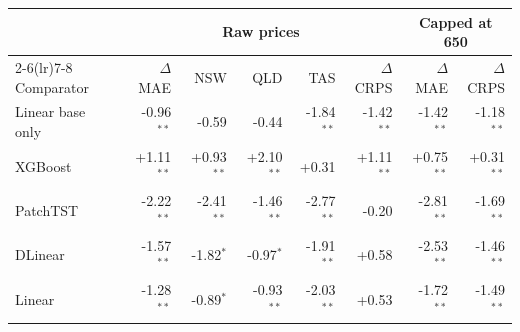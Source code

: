 \begin{tabular}{lrrrrrrr}
\toprule
& \multicolumn{5}{c}{Raw prices} & \multicolumn{2}{c}{Capped at 650} \\
\cmidrule(lr){2-6}\cmidrule(lr){7-8}
Comparator & $\Delta$MAE & NSW & QLD & TAS & $\Delta$CRPS & $\Delta$MAE & $\Delta$CRPS \\
\midrule
Linear base only & -0.96$^{**}$ & -0.59 & -0.44 & -1.84$^{**}$ & -1.42$^{**}$ & -1.42$^{**}$ & -1.18$^{**}$ \\
XGBoost & +1.11$^{**}$ & +0.93$^{**}$ & +2.10$^{**}$ & +0.31 & +1.11$^{**}$ & +0.75$^{**}$ & +0.31$^{**}$ \\
PatchTST & -2.22$^{**}$ & -2.41$^{**}$ & -1.46$^{**}$ & -2.77$^{**}$ & -0.20 & -2.81$^{**}$ & -1.69$^{**}$ \\
DLinear & -1.57$^{**}$ & -1.82$^{*}$ & -0.97$^{*}$ & -1.91$^{**}$ & +0.58 & -2.53$^{**}$ & -1.46$^{**}$ \\
Linear & -1.28$^{**}$ & -0.89$^{*}$ & -0.93$^{**}$ & -2.03$^{**}$ & +0.53 & -1.72$^{**}$ & -1.49$^{**}$ \\
\bottomrule
\end{tabular}
